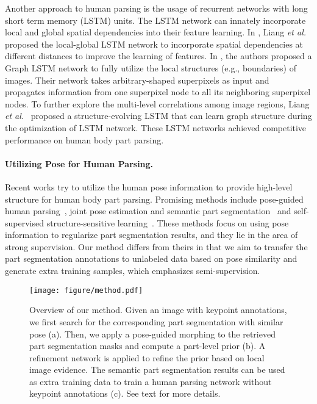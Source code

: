 \documentclass[10pt,twocolumn,letterpaper]{article}
\begin{document}
Another approach to human parsing is the usage of recurrent networks with long short term memory (LSTM) units\cite{hochreiter1997long}. The LSTM network can innately incorporate local and global spatial dependencies into their feature learning. In \cite{liang2016semantic}, Liang \emph{et al.} proposed the local-global LSTM network to incorporate spatial dependencies at different distances to improve the learning of features. In \cite{liang2016semanticG}, the authors proposed a Graph LSTM network to fully utilize the local structures (e.g., boundaries) of images. Their network takes arbitrary-shaped superpixels as input and propagates information from one superpixel node to all its neighboring superpixel nodes. To further explore the multi-level correlations among image regions, Liang \emph{et al.}~\cite{liang2017interpretable} proposed a structure-evolving LSTM that can learn graph structure during the optimization of LSTM network. These LSTM networks achieved competitive performance on human body part parsing.
\vspace{-3mm}
\paragraph{Utilizing Pose for Human Parsing.} Recent works try to utilize the human pose information to provide high-level structure for human body part parsing. Promising methods include pose-guided human parsing~\cite{xia2016pose}, joint pose estimation and semantic part segmentation~\cite{dong2014towards,ladicky2013human,xia2017joint} and self-supervised structure-sensitive learning~\cite{gong2017look}. These methods focus on using pose information to regularize part segmentation results, and they lie in the area of strong supervision. Our method differs from theirs in that we aim to transfer the part segmentation annotations to unlabeled data based on pose similarity and generate extra training samples, which emphasizes semi-supervision.
\begin{figure*}[hbt]
\begin{center}
\texttt{[image: figure/method.pdf]}
\end{center}
\vspace{-3mm}
   \caption{Overview of our method. Given an image with keypoint annotations, we first search for the corresponding part segmentation with similar pose (a). Then, we apply a pose-guided morphing to the retrieved part segmentation masks and compute a part-level prior (b). A refinement network is applied to refine the prior based on local image evidence. The semantic part segmentation results can be used as extra training data to train a human parsing network without keypoint annotations (c). See text for more details.}
\label{fig:overview}
\vspace{-3mm}
\end{figure*}
\vspace{-3mm}
\end{document}
